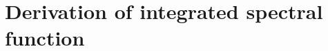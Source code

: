 \chapter{Derivation of integrated spectral\\function\label{app:spectral}}
\thispagestyle{chapterBeginStyle}

